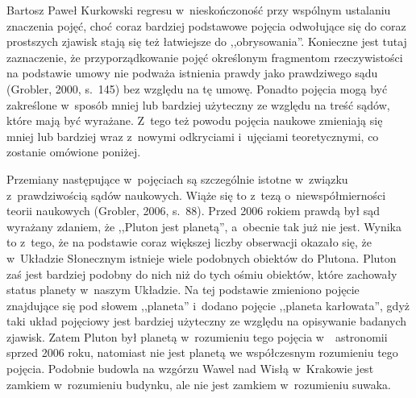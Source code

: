 \begin{artplenv}{Bartosz Paweł Kurkowski}
regresu w~nieskończoność przy wspólnym ustalaniu znaczenia pojęć, choć coraz bardziej podstawowe pojęcia
odwołujące się do coraz
prostszych zjawisk stają się też łatwiejsze do ,,obrysowania''. Konieczne jest tutaj zaznaczenie, że przyporządkowanie
pojęć określonym fragmentom rzeczywistości na podstawie umowy nie podważa istnienia prawdy jako prawdziwego sądu
\label{ref:RNDTsj91YQI9z}(Grobler, 2000, s.~145) bez względu na tę umowę. Ponadto pojęcia mogą być zakreślone w~sposób
mniej lub bardziej użyteczny ze względu na treść sądów, które mają być wyrażane. Z~tego też powodu pojęcia naukowe
zmieniają się mniej lub bardziej wraz z~nowymi odkryciami i~ujęciami teoretycznymi, co zostanie omówione poniżej.


Przemiany następujące w~pojęciach są szczególnie istotne w~związku z~prawdziwością sądów naukowych. Wiąże się to z~tezą
o~niewspółmierności teorii naukowych \label{ref:RND1yueElbIj5}(Grobler, 2006, s.~88). Przed 2006 rokiem prawdą był sąd
wyrażany zdaniem, że ,,Pluton jest planetą'', a~obecnie tak już nie jest. Wynika to z~tego, że na podstawie coraz
większej liczby obserwacji okazało się, że w~Układzie Słonecznym istnieje wiele podobnych obiektów do Plutona. Pluton
zaś jest bardziej podobny do nich niż do tych ośmiu obiektów, które zachowały status planety w~naszym Układzie. Na tej
podstawie zmieniono pojęcie znajdujące się pod słowem ,,planeta'' i~dodano pojęcie ,,planeta karłowata'', gdyż taki układ
pojęciowy jest bardziej użyteczny ze względu na opisywanie badanych zjawisk. Zatem Pluton był planetą w~rozumieniu tego
pojęcia w~~astronomii sprzed 2006 roku, natomiast nie jest planetą we współczesnym rozumieniu tego pojęcia. Podobnie
budowla na wzgórzu Wawel nad Wisłą w~Krakowie jest zamkiem w~rozumieniu budynku, ale nie jest zamkiem w~rozumieniu
suwaka.



\end{artplenv}
